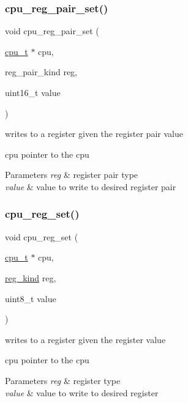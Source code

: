 \subsubsection{\texorpdfstring{cpu\+\_\+reg\+\_\+pair\+\_\+set()}{cpu\_reg\_pair\_set()}}
{\footnotesize\ttfamily void cpu\+\_\+reg\+\_\+pair\+\_\+set (\begin{DoxyParamCaption}\item[{\hyperlink{structcpu__t}{cpu\+\_\+t} $\ast$}]{cpu,  }\item[{reg\+\_\+pair\+\_\+kind}]{reg,  }\item[{uint16\+\_\+t}]{value }\end{DoxyParamCaption})}



writes to a register given the register pair value 

cpu pointer to the cpu 
\begin{DoxyParams}{Parameters}
{\em reg} & register pair type \\
\hline
{\em value} & value to write to desired register pair \\
\hline
\end{DoxyParams}
\mbox{\label{cpu-registers_8h_a422598e03e342ec1c700cd61a3bc69b6}} 
\subsubsection{\texorpdfstring{cpu\+\_\+reg\+\_\+set()}{cpu\_reg\_set()}}
{\footnotesize\ttfamily void cpu\+\_\+reg\+\_\+set (\begin{DoxyParamCaption}\item[{\hyperlink{structcpu__t}{cpu\+\_\+t} $\ast$}]{cpu,  }\item[{\hyperlink{cpu-registers_8h_ae7a73a08aaa7af3cfe957f32ef8af9d3}{reg\+\_\+kind}}]{reg,  }\item[{uint8\+\_\+t}]{value }\end{DoxyParamCaption})}



writes to a register given the register value 

cpu pointer to the cpu 
\begin{DoxyParams}{Parameters}
{\em reg} & register type \\
\hline
{\em value} & value to write to desired register \\
\hline
\end{DoxyParams}
